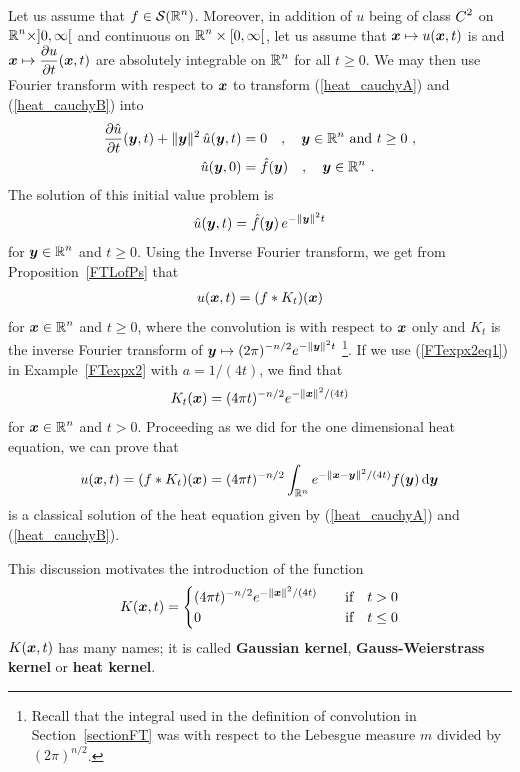Let us assume that $\displaystyle f \in \mathcal{S}(\mathbb{R}^n)$.  Moreover, in addition of
$u$ being of class $\displaystyle C^2$ on
$\displaystyle \mathbb{R}^n \times ]0,\infty[$ and
continuous on $\displaystyle \mathbb{R}^n \times [0,\infty[$, let us assume that
${\bm{x}} \mapsto u({\bm{x}},t)$ is and
$\displaystyle {\bm{x}} \mapsto \frac{\partial{u}}{\partial t}({\bm{x}},t)$ are absolutely
integrable on $\displaystyle \mathbb{R}^n$ for all $t \geq 0$.  We may then use Fourier
transform with respect to ${\bm{x}}$ to transform (\ref{heat_cauchyA})
and (\ref{heat_cauchyB}) into
\begin{align*}
\frac{\partial{\hat{u}}}{\partial t}({\bm{y}},t) + \|{\bm{y}}\|^2\, \hat{u}({\bm{y}},t)
&= 0 \quad , \quad {\bm{y}} \in \mathbb{R}^n \ \text{and} \ t \geq 0 \ , \\
\hat{u}({\bm{y}},0) &= \hat{f}({\bm{y}}) \quad , \quad {\bm{y}} \in \mathbb{R}^n \ .
\end{align*}
The solution of this initial value problem is
\[
\hat{u}({\bm{y}},t) = \hat{f}({\bm{y}})\, e ^{-\|{\bm{y}}\|^2 t}
\]
for $\displaystyle {\bm{y}} \in \mathbb{R}^n$ and $t \geq 0$.
Using the Inverse Fourier transform, we get from
Proposition~\ref{FTLofPs} that
\begin{align} \label{heat_sol_cauch1}
u({\bm{x}},t) = (f \ast K_t)({\bm{x}})
\end{align}
for $\displaystyle {\bm{x}} \in \mathbb{R}^n$ and $t \geq 0$, 
where the convolution is with respect to ${\bm{x}}$ only and
$K_t$ is the inverse Fourier transform of
$\displaystyle {\bm{y}} \mapsto (2\pi)^{-n/2} e ^{-\|{\bm{y}}\|^2 t}$
\footnote{Recall that the integral used in
the definition of convolution in Section~\ref{sectionFT} was
with respect to the Lebesgue measure $m$ divided by
$(2\pi)^{n/2}$.}.  If we use (\ref{FTexpx2eq1}) in
Example~\ref{FTexpx2} with $a = 1/(4t)$, we find that
\[
K_t({\bm{x}}) = (4\pi t)^{-n/2} e^{-\|{\bm{x}}\|^2/(4t)}
\]
for $\displaystyle {\bm{x}} \in \mathbb{R}^n$ and $t > 0$.  Proceeding as we
did for the one dimensional heat equation, we can prove that
\[
u({\bm{x}},t) = (f \ast K_t)({\bm{x}})
= (4\pi t)^{-n/2} \int_{\mathbb{R}^n} e^{-\|{\bm{x}}-{\bm{y}}\|^2/(4t)}
f({\bm{y}}) \,\mathrm{d}{{\bm{y}}}
\]
is a classical solution of the heat equation given by (\ref{heat_cauchyA})
and (\ref{heat_cauchyB}).

This discussion motivates the introduction of the function
\[
K({\bm{x}},t) =
\begin{cases}
\displaystyle (4\pi t)^{-n/2} e^{-\|{\bm{x}}\|^2/(4t)} & \quad 
\text{if} \quad t>0 \\
0 &  \quad \text{if} \quad t\leq 0
\end{cases}
\]
$K({\bm{x}},t)$ has many names; it is called
{\bfseries Gaussian kernel},
{\bfseries Gauss-Weierstrass kernel}
 or
{\bfseries heat kernel}.

